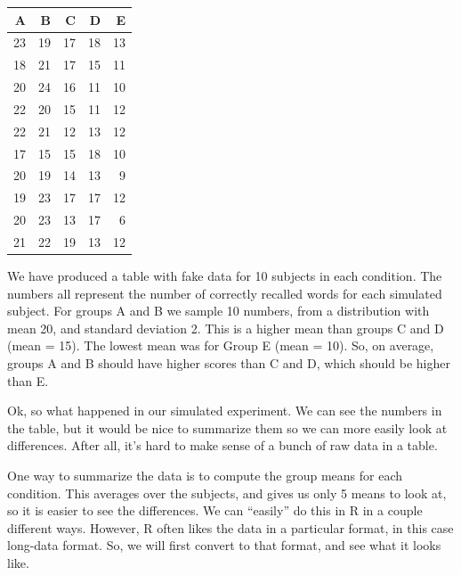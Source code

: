 \begin{tabular}{r|r|r|r|r}
\hline
A & B & C & D & E\\
\hline
23 & 19 & 17 & 18 & 13\\
\hline
18 & 21 & 17 & 15 & 11\\
\hline
20 & 24 & 16 & 11 & 10\\
\hline
22 & 20 & 15 & 11 & 12\\
\hline
22 & 21 & 12 & 13 & 12\\
\hline
17 & 15 & 15 & 18 & 10\\
\hline
20 & 19 & 14 & 13 & 9\\
\hline
19 & 23 & 17 & 17 & 12\\
\hline
20 & 23 & 13 & 17 & 6\\
\hline
21 & 22 & 19 & 13 & 12\\
\hline
\end{tabular}

We have produced a table with fake data for 10 subjects in each
condition. The numbers all represent the number of correctly recalled
words for each simulated subject. For groups A and B we sample 10
numbers, from a distribution with mean 20, and standard deviation 2.
This is a higher mean than groups C and D (mean = 15). The lowest mean
was for Group E (mean = 10). So, on average, groups A and B should have
higher scores than C and D, which should be higher than E.

Ok, so what happened in our simulated experiment. We can see the numbers
in the table, but it would be nice to summarize them so we can more
easily look at differences. After all, it's hard to make sense of a
bunch of raw data in a table.

One way to summarize the data is to compute the group means for each
condition. This averages over the subjects, and gives us only 5 means to
look at, so it is easier to see the differences. We can ``easily'' do
this in R in a couple different ways. However, R often likes the data in
a particular format, in this case long-data format. So, we will first
convert to that format, and see what it looks like.

\begin{Shaded}
\begin{Highlighting}[]
\NormalTok{(}\NormalTok{(}\NormalTok{(}\NormalTok{,}\NormalTok{,}\NormalTok{,}\NormalTok{,}\NormalTok{),}\NormalTok{),}
\NormalTok{(long_data[}\NormalTok{:}\NormalTok{,],}\NormalTok{)}
\end{Highlighting}
\end{Shaded}

